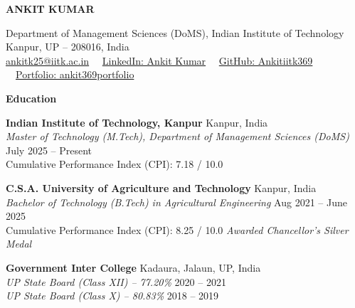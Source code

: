 \documentclass[10pt]{article}
\begin{document}
\begin{center}
    {\Large \textbf{ANKIT KUMAR}}\\ 
    \vspace{2pt}
    \hrulefill
\end{center}
\vspace{-6pt}
\begin{center}
    Department of Management Sciences (DoMS), Indian Institute of Technology Kanpur, UP -- 208016, India\\
    \href{mailto:ankitk25@iitk.ac.in}{ankitk25@iitk.ac.in} \ \textbullet \ 
    \href{https://linkedin.com/in/ankit-kumar}{LinkedIn: Ankit Kumar} \ \textbullet \ 
    \href{https://github.com/Ankitiitk369}{GitHub: Ankitiitk369} \ \textbullet \ 
    \href{https://sites.google.com/view/ankit369portfolio/home}{Portfolio: ankit369portfolio}
\end{center}

\vspace{6pt}

\begin{center}
    \textbf{Education}
\end{center}
\vspace{-4pt}

\textbf{Indian Institute of Technology, Kanpur} \hfill Kanpur, India\\
\textit{Master of Technology (M.Tech), Department of Management Sciences (DoMS)} \hfill July 2025 -- Present\\
Cumulative Performance Index (CPI): 7.18 / 10.0

\vspace{6pt}

\textbf{C.S.A. University of Agriculture and Technology} \hfill Kanpur, India\\
\textit{Bachelor of Technology (B.Tech) in Agricultural Engineering} \hfill Aug 2021 -- June 2025\\
Cumulative Performance Index (CPI): 8.25 / 10.0 \hfill \textit{Awarded Chancellor's Silver Medal}

\vspace{6pt}

\textbf{Government Inter College} \hfill Kadaura, Jalaun, UP, India\\
\textit{UP State Board (Class XII) -- 77.20\%} \hfill 2020 -- 2021\\
\textit{UP State Board (Class X) -- 80.83\%} \hfill 2018 -- 2019
\end{document}
